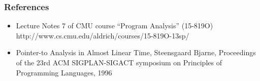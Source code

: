 \documentclass[]{beamer}
\begin{document}
\begin{frame}
  \frametitle{References}
  \begin{itemize}
    \item Lecture Notes 7 of CMU course ``Program Analysis'' (15-819O)\\
      http://www.cs.cmu.edu/aldrich/courses/15-819O-13sp/
    \item Pointer-to Analysis in Almost Linear Time, Steensgaard Bjarne,
      Proceedings of the 23rd ACM SIGPLAN-SIGACT symposium on Principles of
      Programming Languages, 1996
  \end{itemize}
\end{frame}

\end{document}
